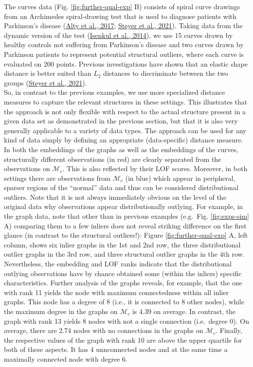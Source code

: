 \documentclass[
  10pt]{article}
\newcommand{\co}{c}
\newcommand{\Min}{\mathcal{M}_{\co}}
\begin{document}
The curves data (Fig. \ref{fig:further-qual-exp} B) consists of spiral curve drawings from an Archimedes spiral-drawing test that is used to diagnose patients with Parkinson's disease (\protect\hyperlink{ref-alty2017use}{Alty et al., 2017}; \protect\hyperlink{ref-steyer2021elastic}{Steyer et al., 2021}). Taking data from the dynamic version of the test (\protect\hyperlink{ref-isenkul2014improved}{Isenkul et al., 2014}), we use 15 curves drawn by healthy controls not suffering from Parkinson's disease and two curves drawn by Parkinson patients to represent potential structural outliers, where each curve is evaluated on 200 points. Previous investigations have shown that an elastic shape distance is better suited than \(L_2\) distances to discriminate between the two groups (\protect\hyperlink{ref-steyer2021elastic}{Steyer et al., 2021}).\\
So, in contrast to the previous examples, we use more specialized distance measures to capture the relevant structures in these settings. This illustrates that the approach is not only flexible with respect to the actual structure present in a given data set as demonstrated in the previous section, but that it is also very generally applicable to a variety of data types. The approach can be used for any kind of data simply by defining an appropriate (data-specific) distance measure.
\\
In both the embeddings of the graphs as well as the embeddings of the curves, structurally different observations (in red) are clearly separated from the observations on \(\Min\). This is also reflected by their LOF scores. Moreover, in both settings there are observations from \(\Min\) (in blue) which appear in peripheral, sparser regions of the ``normal'' data and thus can be considered distributional outliers.
Note that it is not always immediately obvious on the level of the original data why observations appear distributionally outlying. For example, in the graph data, note that other than in previous examples (e.g.~Fig. \ref{fig:exps-sim} A) comparing them to a few inliers does not reveal striking difference on the first glance (in contrast to the structural outliers!): Figure \ref{fig:further-qual-exp} A, left column, shows six inlier graphs in the 1st and 2nd row, the three distributional outlier graphs in the 3rd row, and three structural outlier graphs in the 4th row.\\
Nevertheless, the embedding and LOF ranks indicate that the distributional outlying observations have by chance obtained some (within the inliers) specific characteristics. Further analysis of the graphs reveals, for example, that the one with rank 11 yields the node with maximum connectedness within all inlier graphs. This node has a degree of 8 (i.e., it is connected to 8 other nodes), while the maximum degree in the graphs on \(\Min\) is 4.39 on average. In contrast, the graph with rank 13 yields 8 nodes with not a single connection (i.e.~degree 0). On average, there are 2.74 nodes with no connections in the graphs on \(\Min\).
Finally, the respective values of the graph with rank 10 are above the upper quartile for both of these aspects. It has 4 unnconnected nodes and at the same time a maximally connected node with degree 6.
\end{document}

